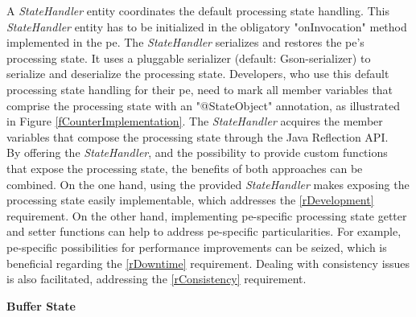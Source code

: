 A \textit{StateHandler} entity coordinates the default processing state handling. This \textit{StateHandler} entity has to be initialized in the obligatory "onInvocation" method implemented in the \gls{pe}. The \textit{StateHandler} serializes and restores the \gls{pe}'s processing state. It uses a pluggable serializer (default: Gson-serializer) to serialize and deserialize the processing state. Developers, who use this default processing state handling for their \gls{pe}, need to mark all member variables that comprise the processing state with an "@StateObject" annotation, as illustrated in Figure \ref{fCounterImplementation}. The \textit{StateHandler} acquires the member variables that compose the processing state through the Java Reflection API.\\
By offering the \textit{StateHandler}, and the possibility to provide custom functions that expose the processing state, the benefits of both approaches can be combined. On the one hand, using the provided \textit{StateHandler} makes exposing the processing state easily implementable, which addresses the \ref{rDevelopment} requirement. On the other hand, implementing \gls{pe}-specific processing state getter and setter functions can help to address \gls{pe}-specific particularities. For example, \gls{pe}-specific possibilities for performance improvements can be seized, which is beneficial regarding the \ref{rDowntime} requirement. Dealing with consistency issues is also facilitated, addressing the \ref{rConsistency} requirement.\par


\textbf{Buffer State}\par


